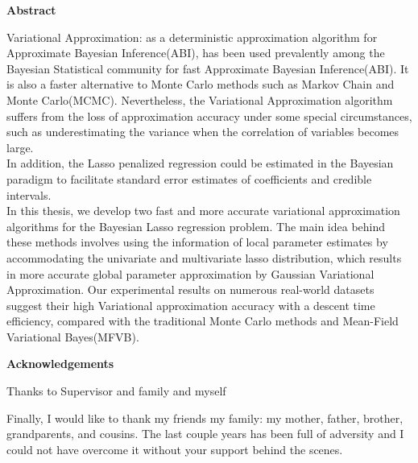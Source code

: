 \pagebreak
\hspace{0pt}

\begin{center}
    \textbf{\large Abstract }\\
    \vspace{0.5cm}
\end{center}
Variational Approximation: as a deterministic approximation algorithm for Approximate Bayesian Inference(ABI), has been used prevalently among the Bayesian Statistical community for fast Approximate Bayesian Inference(ABI). It is also a faster alternative to Monte Carlo methods such as Markov Chain and Monte Carlo(MCMC). Nevertheless, the Variational Approximation algorithm suffers from the loss of approximation accuracy under some special circumstances, such as underestimating the variance when the correlation of variables becomes large. \\
In addition, the Lasso penalized regression could be estimated in the Bayesian paradigm to facilitate standard error estimates of coefficients and credible intervals.\\
In this thesis, we develop two fast and more accurate variational approximation algorithms for the Bayesian Lasso regression problem. The main idea behind these methods involves using the information of local parameter estimates by accommodating the univariate and multivariate lasso distribution, which results in more accurate global parameter approximation by Gaussian Variational Approximation. Our experimental results on numerous real-world datasets suggest their high Variational approximation accuracy with a descent time efficiency, compared with the traditional Monte Carlo methods and Mean-Field Variational Bayes(MFVB).


\newpage

\begin{center}
    \textbf{\large Acknowledgements}\\
    \vspace{0.5cm}
\end{center}
   Thanks to Supervisor and family and myself
   
   Finally, I would like to thank my friends   my family: my mother, father, brother, grandparents, and cousins. The last couple years has been full of adversity and I could not have overcome it without your support behind the scenes.
   
\vfill
\hspace{0pt}
\pagebreak
\newpage